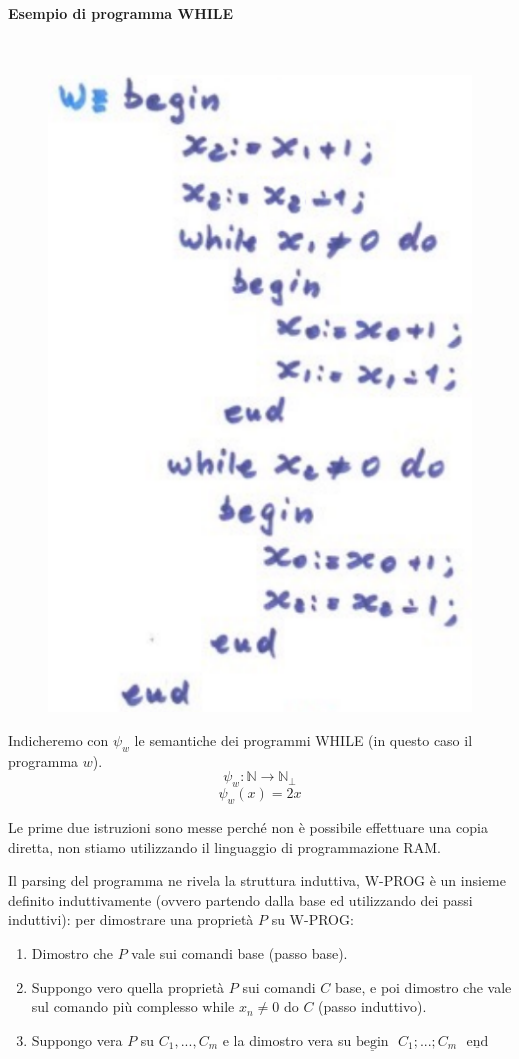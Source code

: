 \documentclass{article}
\begin{document}
\paragraph{Esempio di programma WHILE}\mbox{}\\
\begin{figure}[H]
    \centering
    \includegraphics[scale=0.5]{images/esempio_prog_while.png}
\end{figure}
Indicheremo con $\psi_w$ le semantiche dei programmi WHILE (in questo caso il programma $w$).
$$\psi_w :\mathbb{N}\rightarrow\mathbb{N}_\bot$$
$$\psi_w (x)=2x$$

Le prime due istruzioni sono messe perché non è possibile effettuare una copia diretta,
non stiamo utilizzando il linguaggio di programmazione RAM.

Il parsing del programma ne rivela la struttura induttiva,
W-PROG è un insieme definito induttivamente (ovvero partendo
dalla base ed utilizzando dei passi induttivi): per dimostrare una proprietà $P$ su W-PROG:
\begin{enumerate}
    \item Dimostro che $P$ vale sui comandi base (passo base).

    \item Suppongo vero quella proprietà $P$ sui comandi $C$ base, e
          poi dimostro che vale sul comando più complesso $\text{while }x_n\neq 0\text{ do } C$
          (passo induttivo).

    \item Suppongo vera $P$ su $C_1,...,C_m$ e la dimostro vera su $\underline{\text{begin}}\text{ }
              C_1;...;C_m\text{ }\underline{\text{end}}$
\end{enumerate}
\end{document}
